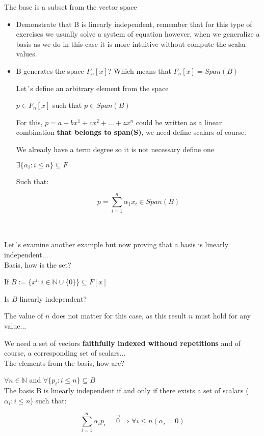 \documentclass{article}
\begin{document}
The base is a subset from the vector space
\begin{itemize}
    \item Demonstrate that B is linearly independent, remember that for this type of exercises we usually solve a system of equation however, when we generalize a basis as we do in this case it is more intuitive without compute the scalar values.
    \item B generates the space \(F_n[x]\)? Which means that \(F_n[x] = Span(B)\)

    Let´s define an arbitrary element from the space 

    \(p \in F_n[x]\) such that \(p \in Span(B)\)

For this, \(p = a + bx^1 + cx^2 + ... + z x^n\) could be written as a linear combination\textbf{ that belongs to span(S)}, we need define scalars of course. 

    We already have a term degree so it is not necessary define one

    \(\exists \{ \alpha_i : i \leq n\} \subseteq F\)

    Such that:

    \[
    p = \sum_{i=1}^{n} \alpha_1 x_i  \in Span(B)
    \]
\end{itemize}
\\
\\
Let´s examine another example but now proving that a basis is linearly independent...
\\
Basis, how is the set?

If \(B := \{x^i : i \in \mathbb{N}\cup \{0\}\} \subseteq F[x]\)

Is \(B\) linearly independent?

The value of \(n\) does not matter for this case, as this result \(n\) must hold for any value...

We need a set of vectors \textbf{faithfully indexed withoud repetitions} and of course, a corresponding set of scalars...
\\

The elements from the basis, how are?

\(\forall n \in \mathbb{N}\) and \(\forall \{p_i : i \leq n \} \subseteq B\)
\\

The basis B is linearly independent if and only if there exists a set of scalars (\(\alpha_i : i \leq n\)) such that:

\[
\sum_{i=1}^{n} \alpha_i p_i = \vec{0} \Rightarrow \forall i \leq n (\alpha_i = 0)
\]
\end{document}
